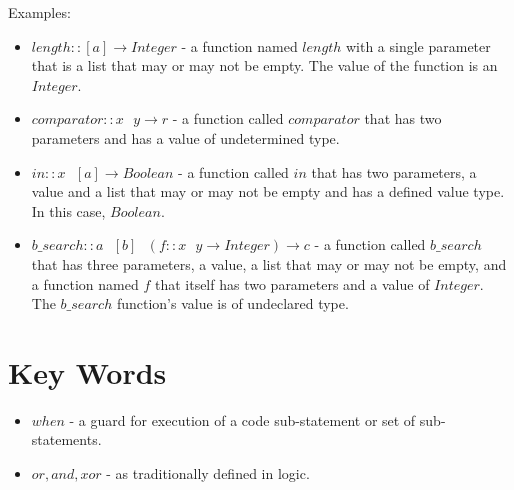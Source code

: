 \documentclass[12pt]{amsart}
\begin{document}
Examples:
\begin{itemize}
\item $length::[a]\rightarrow Integer$ - a function named $length$ with a single parameter that is a list that may or may not be empty. The value of the function is an $Integer$.
\item $comparator::x\text{ }y\rightarrow r$ - a function called $comparator$ that has two parameters and has a value of undetermined type.
\item $in::x\text{ }[a]\rightarrow Boolean$ - a function called $in$ that has two parameters, a value and a list that may or may not be empty and has a defined value type. In this case, $Boolean$.
\item $b\_search:: a\text{ }[b]\text{ }(f::x\text{ }y\rightarrow Integer)\rightarrow c$ -  a function called $b\_search$ that has three parameters, a value, a list that may or may not be empty, and a function named $f$ that itself has two parameters and a value of $Integer$. The $b\_search$ function's value is of undeclared type.
\end{itemize}

\section{Key Words}
\begin{itemize}
\item $when$ - a guard for execution of a code sub-statement or set of sub-statements.
\item $or, and, xor$ - as traditionally defined in logic.
\end{itemize}
\end{document}
